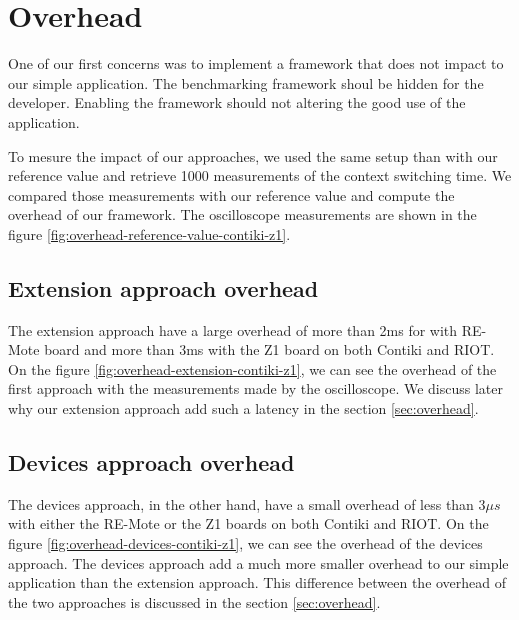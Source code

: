 \section{Overhead}

One of our first concerns was to implement a framework that does not impact to our simple application.
The benchmarking framework shoul be hidden for the developer.
Enabling the framework should not altering the good use of the application.

To mesure the impact of our approaches, we used the same setup than with our reference value and retrieve 1000 measurements of the context switching time.
We compared those measurements with our reference value and compute the overhead of our framework.
The oscilloscope measurements are shown in the figure \ref{fig:overhead-reference-value-contiki-z1}.

\subsection{Extension approach overhead}

The extension approach have a large overhead of more than 2ms for with RE-Mote board and more than 3ms with the Z1 board on both Contiki and RIOT.
On the figure \ref{fig:overhead-extension-contiki-z1}, we can see the overhead of the first approach with the measurements made by the oscilloscope.
We discuss later why our extension approach add such a latency in the section \ref{sec:overhead}.

\subsection{Devices approach overhead}

The devices approach, in the other hand, have a small overhead of less than $3\mu s$ with either the RE-Mote or the Z1 boards on both Contiki and RIOT.
On the figure \ref{fig:overhead-devices-contiki-z1}, we can see the overhead of the devices approach.
The devices approach add a much more smaller overhead to our simple application than the extension approach.
This difference between the overhead of the two approaches is discussed in the section \ref{sec:overhead}.

